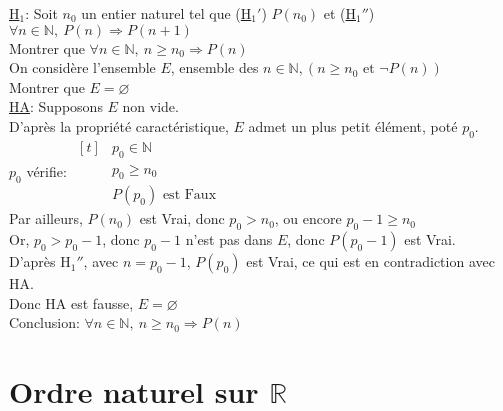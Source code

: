 \documentclass[12pt,twoside,a4paper]{article}
\begin{document}
		\begin{preuve}
			\underline{H$_1$}: Soit $n_0$ un entier naturel tel que (\underline{H$_1'$}) $P(n_0)$ et (\underline{H$_1''$}) $\forall n\in\mathbb{N},\ P(n)\Rightarrow P(n+1)$\\
			Montrer que $\forall n\in\mathbb{N},\ n\geqslant n_0\Rightarrow P(n)$\\
			On consid\`ere l'ensemble $E$, ensemble des $n\in\mathbb{N}, (n\geqslant n_0\text{ et }\neg P(n))$\\
			Montrer que $E=\varnothing$\\
			\underline{HA}: Supposons $E$ non vide.\\
			D'apr\`es la propri\'et\'e caract\'eristique, $E$ admet un plus petit \'el\'ement, pot\'e $p_0$.\\
			$p_0$ v\'erifie: $\begin{aligned}[t] & p_0\in\mathbb{N}\\ & p_0\geqslant n_0 \\ & P(p_0)\text{ est Faux}\end{aligned}$\\
			Par ailleurs, $P(n_0)$ est Vrai, donc $p_0>n_0$, ou encore $p_0-1\geqslant n_0$\\
			Or, $p_0>p_0-1$, donc $p_0-1$ n'est pas dans $E$, donc $P(p_0-1)$ est Vrai.\\
			D'apr\`es H$_1''$, avec $n=p_0-1$, $P(p_0)$ est Vrai, ce qui est en contradiction avec HA.\\
			Donc HA est fausse, $E=\varnothing$\\
			Conclusion: $\forall n\in\mathbb{N},\ n\geqslant n_0\Rightarrow P(n)$
		\end{preuve}
	\section{Ordre naturel sur $\mathbb{R}$}
\end{document}
